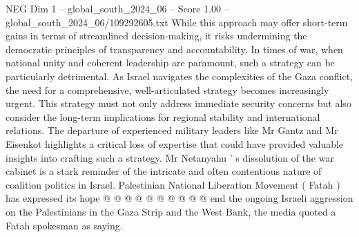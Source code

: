 \begin{textsample}{NEG Dim 1 – global\_south\_2024\_06 – Score 1.00 – global\_south\_2024\_06/109292605.txt}
While this approach may offer short-term gains in terms of streamlined decision-making, it risks undermining the democratic principles of transparency and accountability.
In times of war, when national unity and coherent leadership are paramount, such a strategy can be particularly detrimental.
As Israel navigates the complexities of the Gaza conflict, the need for a comprehensive, well-articulated strategy becomes increasingly urgent.
This strategy must not only address immediate security concerns but also consider the long-term implications for regional stability and international relations.
The departure of experienced military leaders like Mr Gantz and Mr Eisenkot highlights a critical loss of expertise that could have provided valuable insights into crafting such a strategy.
Mr Netanyahu ' s dissolution of the war cabinet is a stark reminder of the intricate and often contentious nature of coalition politics in Israel.
Palestinian National Liberation Movement ( Fatah ) has expressed its hope @ @ @ @ @ @ @ @ @ @ end the ongoing Israeli aggression on the Palestinians in the Gaza Strip and the West Bank, the media quoted a Fatah spokesman as saying.

\end{textsample}
